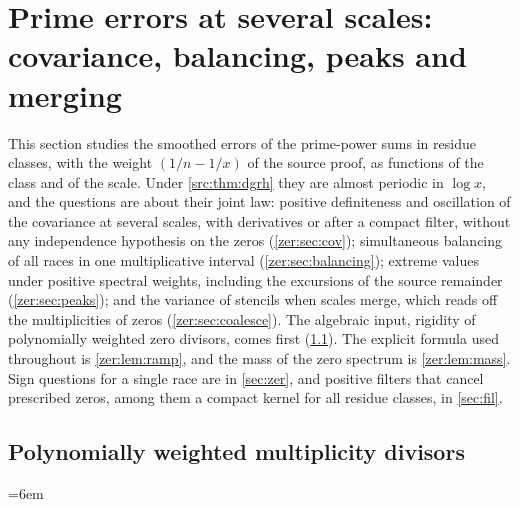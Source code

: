 \providecommand{\zerJ}{\mathcal{J}}
\providecommand{\zerK}{\mathcal{K}}
\providecommand{\zersinc}{\operatorname{sinc}}
\providecommand{\zergE}{\gamma_{\mathrm{E}}}
\providecommand{\zerLL}{\mathcal{L}}
\providecommand{\zerconv}{\operatorname{conv}}
\providecommand{\zerdiag}{\operatorname{diag}}
\providecommand{\zerSym}{\mathfrak{D}}
\providecommand{\zerLog}{\operatorname{Log}}
\providecommand{\anapos}[1]{\bigl(#1\bigr)_{+}}
\providecommand{\ananeg}[1]{\bigl(#1\bigr)_{-}}
\providecommand{\anaone}{\mathbf{1}}
\providecommand{\anaE}{\mathcal{E}}
\providecommand{\anaEx}{\mathbb{E}}
\providecommand{\anaPr}{\mathbb{P}}
\providecommand{\anaM}{\mathcal{M}}
\providecommand{\anaW}{\mathcal{W}}
\providecommand{\anaZ}{\mathcal{Z}}
\providecommand{\anaC}{\mathcal{C}}
\section{Prime errors at several scales: covariance, balancing, peaks and merging}\label{sec:flu}

This section studies the smoothed errors of the prime-power sums in residue classes, with the
weight $(1/n-1/x)$ of the source proof, as functions of the class and of the scale. Under
\cref{src:thm:dgrh} they are almost periodic in $\log x$, and the questions are about their joint
law: positive definiteness and oscillation of the covariance at several scales, with derivatives
or after a compact filter, without any independence hypothesis on the zeros
(\cref{zer:sec:cov}); simultaneous balancing of all races in one multiplicative interval
(\cref{zer:sec:balancing}); extreme values under positive spectral weights, including the
excursions of the source remainder (\cref{zer:sec:peaks}); and the variance of stencils when
scales merge, which reads off the multiplicities of zeros (\cref{zer:sec:coalesce}). The
algebraic input, rigidity of polynomially weighted zero divisors, comes first
(\cref{flu:sec:polyrigid}). The explicit formula used throughout is \cref{zer:lem:ramp}, and the
mass of the zero spectrum is \cref{zer:lem:mass}. Sign questions for a single race are in
\cref{sec:zer}, and positive filters that cancel prescribed zeros, among them a compact kernel
for all residue classes, in \cref{sec:fil}.

\subsection{Polynomially weighted multiplicity divisors}\label{flu:sec:polyrigid}
{\emergencystretch=6em}

